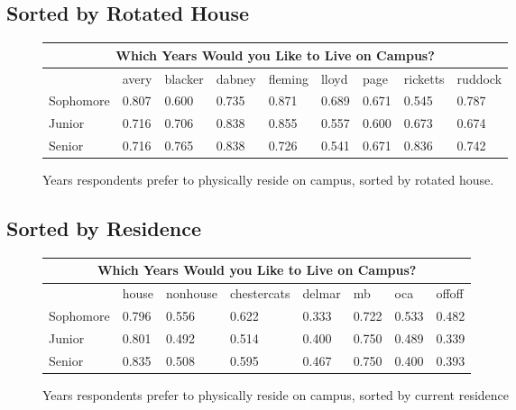 \documentclass[12pt]{article} %
\begin{document}
\subsection{Sorted by Rotated House}
\begin{figure}[H]
	\begin{center}
\begin{tabular}{|m{2 cm}|m{1.3 cm}|m{1.3 cm}|m{1.3 cm}|m{1.3 cm}|m{1.3 cm}|m{1.3 cm}|m{1.3 cm}|m{1.3 cm} |}
\hline
\multicolumn{9}{|c|}{Which Years Would you Like to Live on Campus?}\\ \hline
& avery& blacker& dabney& fleming& lloyd& page& ricketts& ruddock\\ \hline
Sophomore   &  0.807 &  0.600 &  0.735 &  0.871 &  0.689 &  0.671 &  0.545 &  0.787\\ \hline
Junior   &  0.716 &  0.706 &  0.838 &  0.855 &  0.557 &  0.600 &  0.673 &  0.674\\ \hline
Senior   &  0.716 &  0.765 &  0.838 &  0.726 &  0.541 &  0.671 &  0.836 &  0.742\\ \hline
\end{tabular}
\end{center}
	\caption{Years respondents prefer to physically reside on campus, sorted by rotated house.}
	
\end{figure}

\subsection{Sorted by Residence}

\begin{figure}[H]
	\begin{center}
\begin{tabular}{|m{2 cm}|m{1.7 cm}|m{1.7 cm}|m{2 cm}|m{1.7 cm}|m{1.7 cm}|m{1.7 cm}|m{1.7 cm} |}
\hline
\multicolumn{8}{|c|}{Which Years Would you Like to Live on Campus?}\\ \hline
& house& nonhouse& chestercats& delmar& mb& oca& offoff\\ \hline
Sophomore   &  0.796 &  0.556 &  0.622 &  0.333 &  0.722 &  0.533 &  0.482\\ \hline
Junior   &  0.801 &  0.492 &  0.514 &  0.400 &  0.750 &  0.489 &  0.339\\ \hline
Senior   &  0.835 &  0.508 &  0.595 &  0.467 &  0.750 &  0.400 &  0.393\\ \hline
\end{tabular}
\end{center}
	\caption{Years respondents prefer to physically reside on campus, sorted by current residence}
\end{figure}
\newpage
\end{document}
